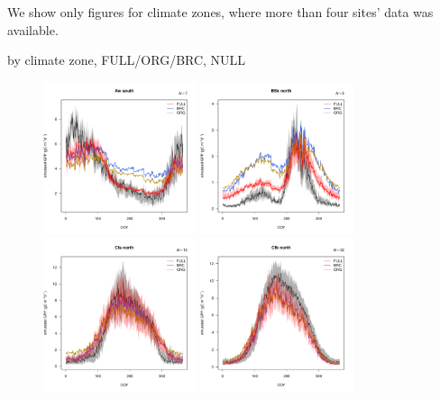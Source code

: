 \documentclass{myreport}
\begin{document}
 We show only figures for climate zones, where more than four sites' data was available.
 
 by climate zone, FULL/ORG/BRC, NULL
 

 \begin{figure}[!ht]
    \centering
\includegraphics[width=0.4\textwidth]{fig/meandoy_byzone_Aw_south_FULL.pdf}
\includegraphics[width=0.4\textwidth]{fig/meandoy_byzone_BSk_north_FULL.pdf}\\
\includegraphics[width=0.4\textwidth]{fig/meandoy_byzone_Cfa_north_FULL.pdf}
\includegraphics[width=0.4\textwidth]{fig/meandoy_byzone_Cfb_north_FULL.pdf}\\

\end{figure}
\end{document}
